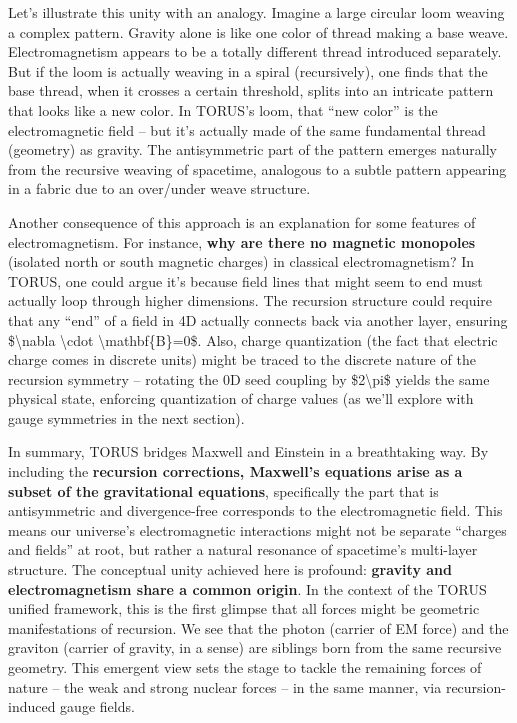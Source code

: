 \documentclass[
]{article}
\begin{document}
Let's illustrate this unity with an analogy. Imagine a large circular
loom weaving a complex pattern. Gravity alone is like one color of
thread making a base weave. Electromagnetism appears to be a totally
different thread introduced separately. But if the loom is actually
weaving in a spiral (recursively), one finds that the base thread, when
it crosses a certain threshold, splits into an intricate pattern that
looks like a new color. In TORUS's loom, that ``new color'' is the
electromagnetic field -- but it's actually made of the same fundamental
thread (geometry) as gravity. The antisymmetric part of the pattern
emerges naturally from the recursive weaving of spacetime, analogous to
a subtle pattern appearing in a fabric due to an over/under weave
structure.

Another consequence of this approach is an explanation for some features
of electromagnetism. For instance, \textbf{why are there no magnetic
monopoles} (isolated north or south magnetic charges) in classical
electromagnetism? In TORUS, one could argue it's because field lines
that might seem to end must actually loop through higher dimensions. The
recursion structure could require that any ``end'' of a field in 4D
actually connects back via another layer, ensuring
\$\textbackslash nabla \textbackslash cdot
\textbackslash mathbf\{B\}=0\$\hspace{0pt}. Also, charge quantization
(the fact that electric charge comes in discrete units) might be traced
to the discrete nature of the recursion symmetry -- rotating the 0D seed
coupling by \$2\textbackslash pi\$ yields the same physical state,
enforcing quantization of charge values (as we'll explore with gauge
symmetries in the next section).

In summary, TORUS bridges Maxwell and Einstein in a breathtaking way. By
including the \textbf{recursion corrections, Maxwell's equations arise
as a subset of the gravitational equations}, specifically the part that
is antisymmetric and divergence-free corresponds to the electromagnetic
field. This means our universe's electromagnetic interactions might not
be separate ``charges and fields'' at root, but rather a natural
resonance of spacetime's multi-layer structure. The conceptual unity
achieved here is profound: \textbf{gravity and electromagnetism share a
common origin}. In the context of the TORUS unified framework, this is
the first glimpse that all forces might be geometric manifestations of
recursion. We see that the photon (carrier of EM force) and the graviton
(carrier of gravity, in a sense) are siblings born from the same
recursive geometry. This emergent view sets the stage to tackle the
remaining forces of nature -- the weak and strong nuclear forces -- in
the same manner, via recursion-induced gauge fields.
\end{document}
